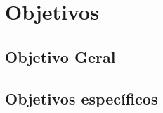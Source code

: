 \section{Objetivos}
\subsection{Objetivo Geral}
\blindtext

\subsection{Objetivos específicos}
\blinditemize
